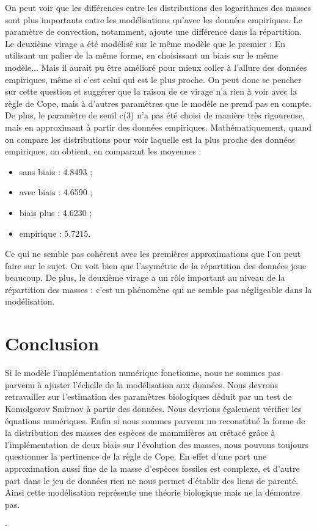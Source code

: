 \documentclass[fleqn,10pt]{SelfArx}
\begin{document}
On peut voir que les différences entre les distributions des logarithmes des masses sont plus importants entre les modélisations qu'avec les données empiriques. Le paramètre de convection, notamment, ajoute une différence dans la répartition.
\\Le deuxième virage a été modélisé sur le même modèle que le premier : En utilisant un palier de la même forme, en choisissant un biais sur le même modèle... Mais il aurait pu être amélioré pour mieux coller à l'allure des données empiriques, même si c'est celui qui est le plus proche. On peut donc se pencher sur cette question et suggérer que la raison de ce virage n'a rien à voir avec la règle de Cope, mais à d'autres paramètres que le modèle ne prend pas en compte. De plus, le paramètre de seuil c(3) n'a pas été choisi de manière très rigoureuse, mais en approximant à partir des données empiriques.
Mathématiquement, quand on compare les distributions pour voir laquelle est la plus proche des données empiriques, on obtient, en comparant les moyennes :
\begin{itemize}
\item sans biais : 4.8493 ;
\item avec biais : 4.6590 ;
\item biais plus : 4.6230 ;
\item empirique : 5.7215.
\end{itemize}
Ce qui ne semble pas cohérent avec les premières approximations que l'on peut faire sur le sujet. On voit bien que l'asymétrie de la répartition des données joue beaucoup. De plus, le deuxième virage a un rôle important au niveau de la répartition des masses : c'est un phénomène qui ne semble pas négligeable dans la modélisation.


\section*{Conclusion}
Si le modèle l'implémentation numérique fonctionne, nous ne sommes pas parvenu à ajuster l'échelle de la modélisation aux données. Nous devrons retravailler sur l'estimation des paramètres biologiques déduit par un test de Komolgorov Smirnov à partir des données. Nous devrions également vérifier les équations numériques. Enfin si nous sommes parvenu un reconstitué la forme de la distribution des masses des espèces de mammifères au crétacé grâce à l'implémentation de deux biais sur l'évolution des masses, nous pouvons toujours questionner la pertinence de la règle de Cope. En effet d'une part une approximation aussi fine de la masse d'espèces fossiles est complexe, et d'autre part dans le jeu de données rien ne nous permet d'établir des liens de parenté. Ainsi cette modélisation représente une théorie biologique mais ne la démontre pas.






-
\end{document}
